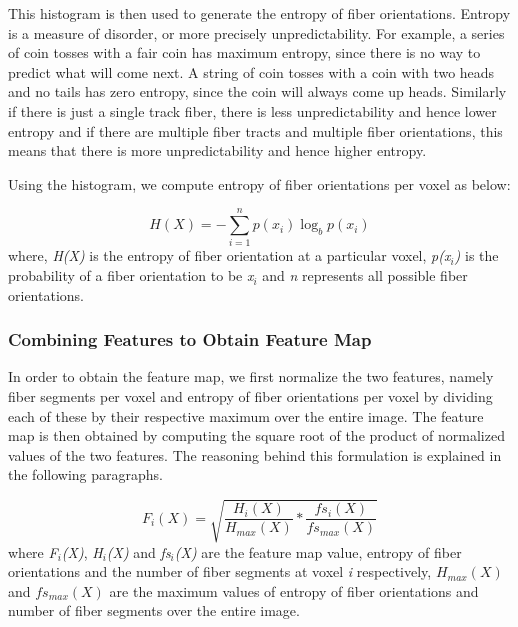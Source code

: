 \documentclass{llncs}
\begin{document}
This histogram is then used to generate the entropy of fiber orientations. Entropy is a measure of disorder, or more precisely unpredictability.  For example, a series of coin tosses with a fair coin has maximum entropy, since there is no way to predict what will come next. A string of coin tosses with a coin with two heads and no tails has zero entropy, since the coin will always come up heads. Similarly if there is just a single track fiber, there is less unpredictability and hence lower entropy and if there are multiple fiber tracts and multiple fiber orientations, this means that there is more unpredictability and hence higher entropy. 
 
Using the histogram, we compute entropy of fiber orientations per voxel as below: 
 
\begin{equation}
H(X) = - \sum_{i=1}^n p(x_i) \log_{b} p(x_i) 
\end{equation}
where, \textit{H(X)} is the entropy of fiber orientation at a particular voxel, \textit{p(x$_{i}$)} is the probability of a fiber orientation to be \textit{x$_{i}$} and \textit{n} represents all possible fiber orientations. 

%
\subsubsection{Combining Features to Obtain Feature Map}
%
In order to obtain the feature map, we first normalize the two features, namely fiber segments per voxel and entropy of fiber orientations per voxel by dividing each of these by their respective maximum over the entire image. The feature map is then obtained by computing the square root of the product of normalized values of the two features. The reasoning behind this formulation is explained in the following paragraphs.

\begin{equation}
    \label{eqn:fEquation}
    F_i(X) = \sqrt {\frac{H_i(X)}{H_{max}(X)} * \frac{fs_i(X)}{fs_{max}(X)} }
\end{equation}
where \textit{F$_i$(X)}, \textit{H$_i$(X)} and \textit{fs$_i$(X)} are the feature map value, entropy of fiber orientations and the number of fiber segments at voxel \textit{i} respectively, \textit{$H_{max}(X)$} and \textit{$fs_{max}(X)$} are the maximum values of entropy of fiber orientations and number of fiber segments over the entire image. 
\end{document}
